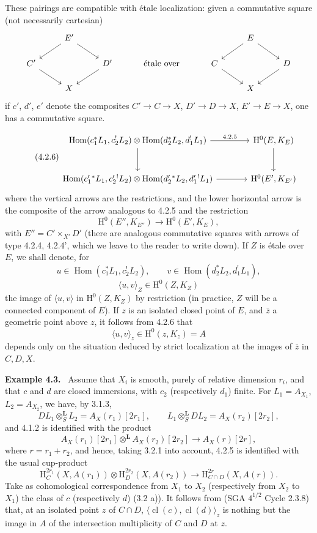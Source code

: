 \documentclass[11pt]{article}
\newenvironment{statement}[1]{\par\medskip\noindent\textbf{#1.}\ }{\par\medskip}
\renewcommand{\H}{\mathrm{H}}
\DeclareMathOperator{\Hom}{Hom}
\providecommand{\cl}{\operatorname{cl}}
\providecommand{\Hom}{\operatorname{Hom}}
\providecommand{\cl}{\operatorname{cl}}
\providecommand{\Hom}{\operatorname{Hom}}
\providecommand{\cl}{\operatorname{cl}}
\begin{document}
These pairings are compatible with étale localization: given a commutative square (not necessarily cartesian)
\[
\begin{tikzcd}[column sep=2.5em,row sep=1.5em]
& E' \arrow[dl] \arrow[dr] & && & E \arrow[dl] \arrow[dr] & \\
C' \arrow[dr] && D' \arrow[dl] & \text{ étale over } & C \arrow[dr] && D \arrow[dl] \\
& X &&&& X &
\end{tikzcd}
\]
if $c'$, $d'$, $e'$ denote the composites $C'\to C\to X$, $D'\to D\to X$, $E'\to E\to X$, one has a commutative square.


\begin{equation}
\tag{4.2.6}
\begin{tikzcd}[column sep=large,row sep=large]
\Hom(c_1^*L_1,c_2^!L_2)\otimes\Hom(d_2^*L_2,d_1^!L_1)
  \arrow[r,"4.2.5"] \arrow[d] &
\H^0(E,K_E)\arrow[d] \\
\Hom(c_1'{}^*L_1,c_2'{}^!L_2)\otimes\Hom(d_2'{}^*L_2,d_1'{}^!L_1)
  \arrow[r] &
\H^0(E',K_{E'})
\end{tikzcd}
\end{equation}
where the vertical arrows are the restrictions, and the lower horizontal arrow is the composite of the arrow analogous to 4.2.5 and the restriction
\[
\H^0(E'',K_{E''})\longrightarrow \H^0(E',K_{E}),
\]
with $E''=C'\times_{X'}D'$ (there are analogous commutative squares with arrows of type 4.2.4, 4.2.4', which we leave to the reader to write down). If $Z$ is étale over $E$, we shall denote, for
\[
u\in\Hom(c_1^*L_1,c_2^!L_2),\qquad
v\in\Hom(d_2^*L_2,d_1^!L_1),
\]
\begin{equation}
\tag{4.2.7}
\langle u,v\rangle_Z\in \H^0(Z,K_Z)
\end{equation}
the image of $\langle u,v\rangle$ in $\H^0(Z,K_Z)$ by restriction (in practice, $Z$ will be a connected component of $E$). If $z$ is an isolated closed point of $E$, and $\bar z$ a geometric point above $z$, it follows from 4.2.6 that
\[
\langle u,v\rangle_z\in \H^0(z,K_z)=A
\]
depends only on the situation deduced by strict localization at the images of $\bar z$ in $C,D,X$.

\begin{statement}{Example 4.3}
Assume that $X_i$ is smooth, purely of relative dimension $r_i$, and that $c$ and $d$ are closed immersions, with $c_2$ (respectively $d_1$) finite. For $L_1=A_{X_1}$, $L_2=A_{X_2}$, we have, by 3.1.3,
\[
DL_1\otimes_S^{\mathbf L}L_2=A_X(r_1)[2r_1],\qquad
L_1\otimes_S^{\mathbf L}DL_2=A_X(r_2)[2r_2],
\]
and 4.1.2 is identified with the product
\[
A_X(r_1)[2r_1]\otimes^{\mathbf L}A_X(r_2)[2r_2]\longrightarrow A_X(r)[2r],
\]
where $r=r_1+r_2$, and hence, taking 3.2.1 into account, 4.2.5 is identified with the usual cup-product
\[
\H_C^{2r_1}(X,A(r_1))\otimes \H_D^{2r_2}(X,A(r_2))
\longrightarrow
\H_{C\cap D}^{2r}(X,A(r)).
\]
Take as cohomological correspondence from $X_1$ to $X_2$ (respectively from $X_2$ to $X_1$) the class of $c$ (respectively $d$) (3.2 a)). It follows from (SGA $4^{1/2}$ Cycle 2.3.8) that, at an isolated point $z$ of $C\cap D$, $\langle \cl(c),\cl(d)\rangle_z$ is nothing but the image in $A$ of the intersection multiplicity of $C$ and $D$ at $z$.
\end{statement}
\end{document}
